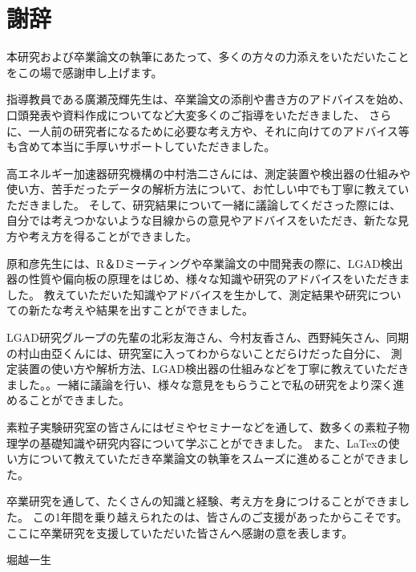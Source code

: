 \chapter{謝辞}

本研究および卒業論文の執筆にあたって、多くの方々の力添えをいただいたことをこの場で感謝申し上げます。

指導教員である廣瀬茂輝先生は、卒業論文の添削や書き方のアドバイスを始め、口頭発表や資料作成についてなど大変多くのご指導をいただきました、
さらに、一人前の研究者になるために必要な考え方や、それに向けてのアドバイス等も含めて本当に手厚いサポートしていただきました。

高エネルギー加速器研究機構の中村浩二さんには、測定装置や検出器の仕組みや使い方、苦手だったデータの解析方法について、お忙しい中でも丁寧に教えていただきました。
そして、研究結果について一緒に議論してくださった際には、自分では考えつかないような目線からの意見やアドバイスをいただき、新たな見方や考え方を得ることができました。

原和彦先生には、R＆Dミーティングや卒業論文の中間発表の際に、LGAD検出器の性質や偏向板の原理をはじめ、様々な知識や研究のアドバイスをいただきました。
教えていただいた知識やアドバイスを生かして、測定結果や研究についての新たな考えや結果を出すことができました。

LGAD研究グループの先輩の北彩友海さん、今村友香さん、西野純矢さん、同期の村山由亞くんには、研究室に入ってわからないことだらけだった自分に、
測定装置の使い方や解析方法、LGAD検出器の仕組みなどを丁寧に教えていただきました。。一緒に議論を行い、様々な意見をもらうことで私の研究をより深く進めることができました。

素粒子実験研究室の皆さんにはゼミやセミナーなどを通して、数多くの素粒子物理学の基礎知識や研究内容について学ぶことができました。
また、LaTexの使い方について教えていただき卒業論文の執筆をスムーズに進めることができました。

卒業研究を通して、たくさんの知識と経験、考え方を身につけることができました。
この1年間を乗り越えられたのは、皆さんのご支援があったからこそです。
ここに卒業研究を支援していただいた皆さんへ感謝の意を表します。


\begin{flushright}
    堀越一生
\end{flushright}